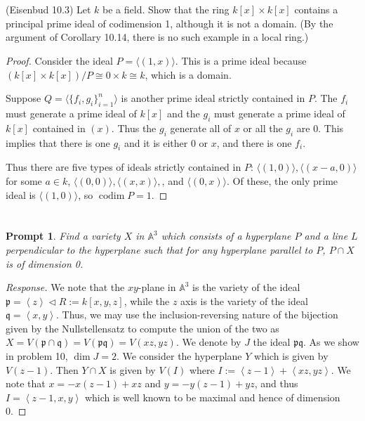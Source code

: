 \documentclass[Letter,12pt]{article}
\newcommand{\A}{\mathbb{A}}
\newcommand{\pfr}{\mathfrak{p}}
\newcommand{\qfr}{\mathfrak{q}}
\newcommand{\<}{\left\langle}
\renewcommand{\>}{\right\rangle}
\DeclareMathOperator{\codim}{codim}
\newcommand{\idl}[1]{\left\langle{#1}\right\rangle }
\newcommand{\prob}[1]{\setcounter{section}{#1-1}\section{}}
\newtheorem*{prompt*}{Prompt}
\theoremstyle{definition}
\begin{document}
	
	\prob{7} (Eisenbud 10.3)
	Let $k$ be a field.  Show that the ring $k[x]\times k[x]$ contains a principal prime ideal of codimension 1, although it is not a domain. (By the argument of Corollary 10.14, there is no such example in a local ring.)
	\begin{proof}
		Consider the ideal $P=\langle (1,x)\rangle$.  This is a prime ideal because $(k[x]\times k[x])/P\cong 0\times k\cong k$, which is a domain.
		
		Suppose $Q=\langle\{f_i,g_i\}_{i=1}^n\rangle$ is another prime ideal strictly contained in $P$.  The $f_i$ must generate a prime ideal of $k[x]$ and the $g_i$ must generate a prime ideal of $k[x]$ contained in $(x)$.  Thus the $g_i$ generate all of $x$ or all the $g_i$ are 0.  This implies that there is one $g_i$ and it is either $0$ or $x$, and there is one $f_i$.
		
		Thus there are five types of ideals strictly contained in $P$: $\langle (1,0)\rangle,\langle (x-a,0)\rangle$ for some $a\in k$, $\langle (0,0)\rangle,\langle (x,x)\rangle,$, and $\langle (0,x)\rangle$.  Of these, the only prime ideal is $\langle (1,0)\rangle$, so $\codim P=1$.
	\end{proof}
	
	\prob{8}
	\begin{prompt*}
		Find a variety $X$ in $\A^3$ which consists of a hyperplane $P$ and a line $L$ perpendicular to the hyperplane such that for any hyperplane parallel to $P$, $P\cap X$ is of dimension 0.
	\end{prompt*}
	\begin{proof}[Response]
		We note that the $xy$-plane in $\A^3$ is the variety of the ideal $\pfr=\idl{z}\triangleleft R:=k[x,y,z]$, while the $z$ axis is the variety of the ideal $\qfr=\idl{x,y}$. Thus, we may use the inclusion-reversing nature of the bijection given by the Nullstellensatz to compute the union of the two as $X=V(\pfr\cap \qfr)=V(\pfr\qfr)=V(xz,yz)$. We denote by $J$ the ideal $\pfr\qfr$. As we show in problem 10, $\dim J=2$. We consider the hyperplane $Y$ which is given by $V(z-1)$. Then $Y\cap X$ is given by $V(I )$ where $I:=\idl{z-1}+\idl{xz,yz}$. We note that $x=-x(z-1)+xz$ and $y=-y(z-1)+yz$, and thus $I=\idl{z-1,x,y}$ which is well known to be maximal and hence of dimension 0.
	\end{proof}
	
\end{document}
